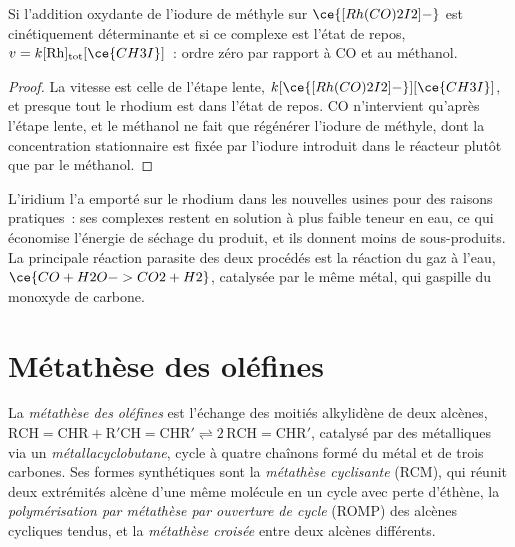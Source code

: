 \begin{proposition}\label{prop:b3:homogeneous-catalysis:monsanto-rate}
Si l'addition oxydante de l'iodure de méthyle sur $\ce{[Rh(CO)2I2]-}$ est cinétiquement déterminante et
si ce complexe est l'état de repos, $v = k[\mathrm{Rh}]_{\mathrm{tot}}[\ce{CH3I}]$~: ordre zéro par rapport à
CO et au méthanol.
\end{proposition}

\begin{proof}
La vitesse est celle de l'étape lente, $k[\ce{[Rh(CO)2I2]-}][\ce{CH3I}]$, et presque tout le
rhodium est dans l'état de repos. CO n'intervient qu'après l'étape lente, et
le méthanol ne fait que régénérer l'iodure de méthyle, dont la
concentration stationnaire est fixée par l'iodure introduit dans le
réacteur plutôt que par le méthanol.
\end{proof}

L'iridium l'a emporté sur le rhodium dans les nouvelles usines pour des
raisons pratiques~: ses complexes restent en solution à plus faible
teneur en eau, ce qui économise l'énergie de séchage du produit, et ils
donnent moins de sous-produits. La principale réaction parasite des deux
procédés est la réaction du gaz à l'eau, $\ce{CO + H2O -> CO2 + H2}$, catalysée par le même métal, qui
gaspille du monoxyde de carbone.

\section{Métathèse des oléfines}

\begin{definition}\label{def:b3:homogeneous-catalysis:metathesis}
La \emph{métathèse des oléfines} est l'échange des
moitiés alkylidène de deux alcènes, $\mathrm{RCH{=}CHR + R'CH{=}CHR' \rightleftharpoons 2\,RCH{=}CHR'}$, catalysé par
des  métalliques via un \emph{métallacyclobutane},
cycle à quatre chaînons formé du métal et de trois carbones. Ses formes
synthétiques sont la \emph{métathèse cyclisante} (RCM), qui
réunit deux extrémités alcène d'une même molécule en un cycle avec perte
d'éthène, la \emph{polymérisation par métathèse par ouverture de cycle}
(ROMP) des alcènes cycliques tendus, et la \emph{métathèse croisée} entre deux
alcènes différents.
\end{definition}

